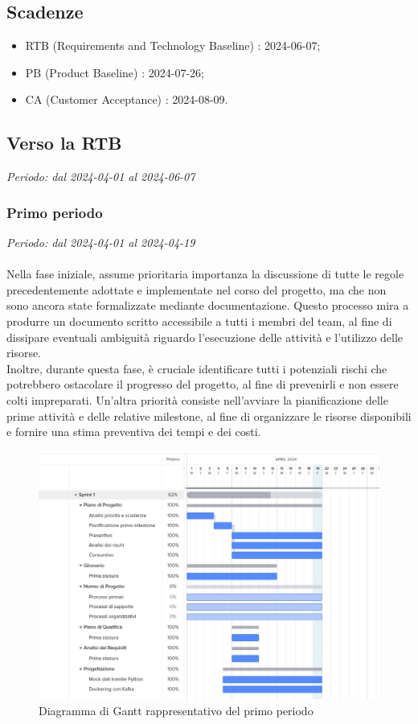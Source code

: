 \subsection{Scadenze}
\begin{itemize}
\setlength\itemsep{0em}
    \item RTB (Requirements and Technology Baseline) : 2024-06-07;
    \item PB (Product Baseline) : 2024-07-26;
    \item CA (Customer Acceptance) : 2024-08-09.
\end{itemize}
\subsection{Verso la RTB}
\textit{Periodo: dal 2024-04-01 al 2024-06-07}
\newpage
\subsubsection{Primo periodo}
\textit{Periodo: dal 2024-04-01 al 2024-04-19}
\\\\
Nella fase iniziale, assume prioritaria importanza la discussione di tutte le regole precedentemente adottate e implementate nel corso del progetto, ma che non sono ancora state formalizzate mediante documentazione. Questo processo mira a produrre un documento scritto accessibile a tutti i membri del team, al fine di dissipare eventuali ambiguità riguardo l'esecuzione delle attività e l'utilizzo delle risorse.
\\
Inoltre, durante questa fase, è cruciale identificare tutti i potenziali rischi che potrebbero ostacolare il progresso del progetto, al fine di prevenirli e non essere colti impreparati. Un'altra priorità consiste nell'avviare la pianificazione delle prime attività e delle relative milestone, al fine di organizzare le risorse disponibili e fornire una stima preventiva dei tempi e dei costi.
\\
\begin{figure}[h]
    \centering
    \includegraphics[width=15cm]{./asset/gantt1.jpeg}
    \caption{Diagramma di Gantt rappresentativo del primo periodo}
    \label{figure:Diagramma di Gantt rappresentativo del primo periodo}
\end{figure}
